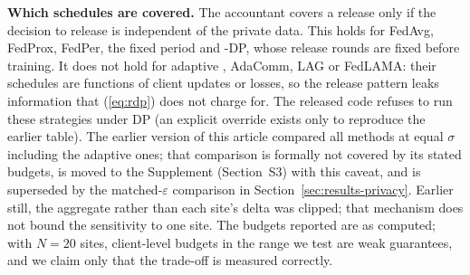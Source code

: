 \textbf{Which schedules are covered.} The accountant covers a release only if the decision to release is independent of the private data. This holds for FedAvg, FedProx, FedPer, the fixed period and \tierfed{}-DP, whose release rounds are fixed before training. It does not hold for adaptive \tierfed{}, AdaComm, LAG or FedLAMA: their schedules are functions of client updates or losses, so the release pattern leaks information that (\ref{eq:rdp}) does not charge for. The released code refuses to run these strategies under DP (an explicit override exists only to reproduce the earlier table). The earlier version of this article compared all methods at equal $\sigma$ including the adaptive ones; that comparison is formally not covered by its stated budgets, is moved to the Supplement (Section~S3) with this caveat, and is superseded by the matched-$\varepsilon$ comparison in Section~\ref{sec:results-privacy}. Earlier still, the aggregate rather than each site's delta was clipped; that mechanism does not bound the sensitivity to one site. The budgets reported are as computed; with $N=20$ sites, client-level budgets in the range we test are weak guarantees, and we claim only that the trade-off is measured correctly.
